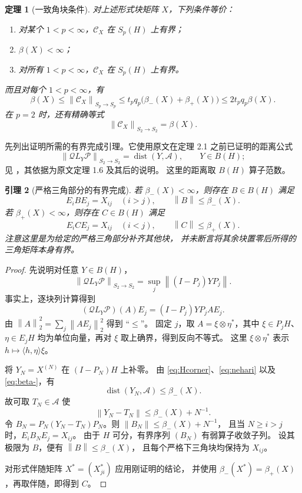 \documentclass[UTF8,11pt,a4paper,fontset=fandol]{ctexart}
\newtheorem{theorem}{定理}[section]
\newtheorem{lemma}[theorem]{引理}
\theoremstyle{remark}
\newcommand{\BH}{B(H)}
\newcommand{\dist}{\operatorname{dist}}
\newcommand{\PP}{\mathcal P}
\newcommand{\QQ}{\mathcal Q}
\newcommand{\Alg}{\mathcal A}
\newcommand{\CC}{\mathcal C}
\newcommand{\norm}[1]{\left\lVert #1\right\rVert}
\begin{document}
\begin{theorem}[一致角块条件]\label{thm:sharp}
对上述形式块矩阵 $X$，下列条件等价：
\begin{enumerate}[label=\textup{(\roman*)}]
 \item 对某个 $1<p<\infty$，$\CC_X$ 在 $S_p(H)$ 上有界；
 \item $\beta(X)<\infty$；
 \item 对所有 $1<p<\infty$，$\CC_X$ 在 $S_p(H)$ 上有界。
\end{enumerate}
而且对每个 $1<p<\infty$，有
\begin{equation}\label{eq:sharpbounds}
 \boxed{\quad
 \beta(X)\leq\norm{\CC_X}_{S_p\to S_p}
 \leq t_pq_p\bigl(\beta_-(X)+\beta_+(X)\bigr)
 \leq2t_pq_p\beta(X).
 \quad}
\end{equation}
在 $p=2$ 时，还有精确等式
\begin{equation}\label{eq:exact2}
 \norm{\CC_X}_{S_2\to S_2}=\beta(X).
\end{equation}
\end{theorem}

先列出证明所需的有界完成引理。它使用原文在定理 2.1
之前已证明的距离公式
\begin{equation}\label{eq:nehari}
 \norm{\QQ L_Y\PP}_{S_2\to S_2}=\dist(Y,\Alg),
 \qquad Y\in\BH;
\end{equation}
见 \cite[p.~277]{Power}，其依据为原文定理 1.6 及其后的说明。
这里的距离取 $B(H)$ 算子范数。

\begin{lemma}[严格三角部分的有界完成]\label{lem:completion}
若 $\beta_-(X)<\infty$，则存在 $B\in\BH$ 满足
\[
 E_iBE_j=X_{ij}\quad(i>j),\qquad
 \norm B\leq\beta_-(X).
\]
若 $\beta_+(X)<\infty$，则存在 $C\in\BH$ 满足
\[
 E_iCE_j=X_{ij}\quad(i<j),\qquad
 \norm C\leq\beta_+(X).
\]
注意这里是为给定的严格三角部分\emph{补齐其他块}，
并未断言将其余块置零后所得的三角矩阵本身有界。
\end{lemma}

\begin{proof}
先说明对任意 $Y\in\BH$，
\begin{equation}\label{eq:Hcorner}
 \norm{\QQ L_Y\PP}_{S_2\to S_2}
 =\sup_j\norm{(I-P_j)YP_j}.
\end{equation}
事实上，逐块列计算得到
\[
 (\QQ L_Y\PP)(A)E_j=(I-P_j)YP_jAE_j.
\]
由 $\norm A_2^2=\sum_j\norm{AE_j}_2^2$ 得到 ``$\leq$''。
固定 $j$，取 $A=\xi\otimes\eta^*$，其中 $\xi\in P_jH$、
$\eta\in E_jH$ 均为单位向量，再对 $\xi$ 取上确界，得到反向不等式。
这里 $\xi\otimes\eta^*$ 表示 $h\mapsto\langle h,\eta\rangle\xi$。

将 $Y_N=X^{(N)}$ 在 $(I-P_N)H$ 上补零。
由 \eqref{eq:Hcorner}、\eqref{eq:nehari} 以及 \eqref{eq:beta-}，有
\[
 \dist(Y_N,\Alg)\leq\beta_-(X).
\]
故可取 $T_N\in\Alg$ 使
\[
 \norm{Y_N-T_N}\leq\beta_-(X)+N^{-1}.
\]
令 $B_N=P_N(Y_N-T_N)P_N$。则 $\norm{B_N}\leq\beta_-(X)+N^{-1}$，
且当 $N\geq i>j$ 时，$E_iB_NE_j=X_{ij}$。
由于 $H$ 可分，有界序列 $(B_N)$ 有弱算子收敛子列。
设其极限为 $B$，便有 $\norm B\leq\beta_-(X)$，
且每个严格下三角块均保持为 $X_{ij}$。

对形式伴随矩阵 $X^*=(X_{ji}^*)$ 应用刚证明的结论，
并使用 $\beta_-(X^*)=\beta_+(X)$，再取伴随，即得到 $C$。
\end{proof}
\end{document}
